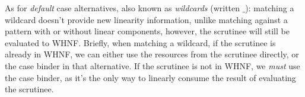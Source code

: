 \documentclass[acmsmall,review,anonymous]{acmart}
\begin{document}


As for \emph{default} case alternatives, also known as \emph{wildcards}
(written $\_$): matching a wildcard doesn't provide new linearity information,
unlike matching against a pattern with or without linear components, however,
the scrutinee will still be evaluated to WHNF.
%
%
Briefly, when matching a wildcard, if the scrutinee is already in WHNF, we can
either use the resources from the scrutinee directly, or the case binder in
that alternative. If the scrutinee is not in WHNF, we \emph{must} use the case
binder, as it's the only way to linearly consume the result of evaluating the
scrutinee.
\end{document}
